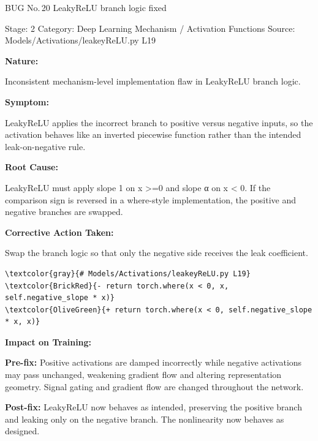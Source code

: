 \documentclass[10pt]{article}
\newcommand{\FieldLabel}[1]{%
 {\bfseries #1:}\par
}
\begin{document}
\begin{bugbox}{BUG No.\,20 \quad LeakyReLU branch logic fixed}
{\color{MetaGray}\small Stage: 2 \;\textbar\; Category: Deep Learning Mechanism / Activation Functions \;\textbar\; Source: Models/Activations/leakeyReLU.py L19\par}
\vspace{0.22em}
\FieldLabel{Nature}
Inconsistent mechanism-level implementation flaw in LeakyReLU branch logic.
\par
\vspace{0.35em}
\FieldLabel{Symptom}
LeakyReLU applies the incorrect branch to positive versus negative inputs, so the activation behaves like an inverted piecewise function rather than the intended leak-on-negative rule.
\par
\vspace{0.35em}
\FieldLabel{Root Cause}
LeakyReLU must apply slope 1 on x \textgreater=0 and slope α on x \textless{} 0. If the comparison sign is reversed in a where-style implementation, the positive and negative branches are swapped.
\par
\vspace{0.35em}
\FieldLabel{Corrective Action Taken}
Swap the branch logic so that only the negative side receives the leak coefficient.
\par
\vspace{0.35em}
\begin{Verbatim}[commandchars=\\\{\},fontsize=\footnotesize,breaklines=true,breaksymbol={},frame=leftline,framerule=2pt,rulecolor=\color{gray!40},xleftmargin=6pt,formatcom=\singlespacing]
\textcolor{gray}{# Models/Activations/leakeyReLU.py L19}
\textcolor{BrickRed}{- return torch.where(x < 0, x, self.negative_slope * x)}
\textcolor{OliveGreen}{+ return torch.where(x < 0, self.negative_slope * x, x)}
\end{Verbatim}
\vspace{0.22em}
\FieldLabel{Impact on Training}
\textbf{Pre-fix:} Positive activations are damped incorrectly while negative activations may pass unchanged, weakening gradient flow and altering representation geometry. Signal gating and gradient flow are changed throughout the network. \par\smallskip
\textbf{Post-fix:} LeakyReLU now behaves as intended, preserving the positive branch and leaking only on the negative branch. The nonlinearity now behaves as designed. 
\par
\vspace{0.35em}
\end{bugbox}
\end{document}
